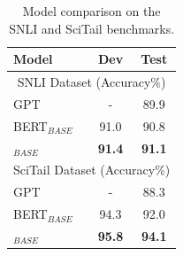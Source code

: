 \begin{table}[htb!]
	\begin{center}
		\begin{tabular}{l | c | c }\hline
	   \bf Model &Dev& Test  \\ \hline 

		\multicolumn{3}{c}{ SNLI Dataset (Accuracy\%)}  \\ \hline 
		GPT \cite{gpt2018} &- & 89.9 \\
		\hline
		BERT$_{BASE}$ &91.0 & 90.8 \\
		\hline		
		{\MNAME}$_{BASE}$ &\textbf{91.4} & \textbf{91.1} \\
		\hline	\hline
		\multicolumn{3}{c}{ SciTail Dataset (Accuracy\%)}  \\ \hline 	GPT \cite{gpt2018} &- &88.3 \\ \hline
		BERT$_{BASE}$ &94.3 & 92.0 \\ \hline
		{\MNAME}$_{BASE}$ &\textbf{95.8} &\textbf{94.1} \\
		\hline
		\end{tabular}
	\end{center}
	\lgspace
	\caption{Model comparison on the SNLI and SciTail benchmarks.
	}
	\label{tab:nli}
\lgspace
\end{table}



